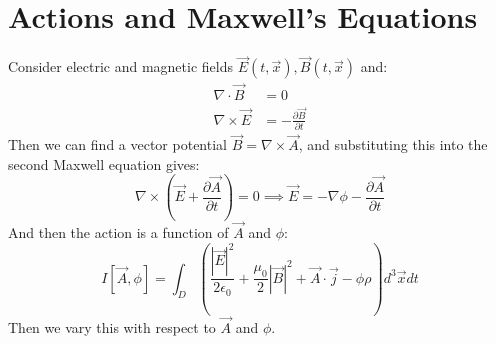 \documentclass[../Main.tex]{subfiles}
\begin{document}
\section{Actions and Maxwell's Equations}
Consider electric and magnetic fields $\vec{E}(t, \vec{x}), \vec{B}(t, \vec{x})$ and:
\begin{align}
    \nabla \cdot \vec{B} &= 0 \label{eqnMaxwellI} \\
    \nabla \times \vec{E} &= -\frac{\partial \vec{B}}{\partial t} \label{eqnMaxwellII}
\end{align}
Then we can find a vector potential $\vec{B} = \nabla \times \vec{A}$, and substituting this into the second Maxwell equation gives:
\begin{equation*}
    \nabla \times (\vec{E} + \frac{\partial \vec{A}}{\partial t}) = 0 \implies \vec{E} = -\nabla \phi - \frac{\partial \vec{A}}{\partial t}
\end{equation*}
And then the action is a function of $\vec{A}$ and $\phi$:
\begin{equation*}
    I[\vec{A}, \phi] = \int_D \left(\frac{|\vec{E}|^2}{2\epsilon_0} + \frac{\mu_0}{2}|\vec{B}|^2 + \vec{A} \cdot \vec{j} - \phi \rho\right) d^3\vec{x} dt
\end{equation*}
Then we vary this with respect to $\vec{A}$ and $\phi$.

\end{document}
